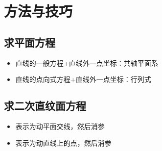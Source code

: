 \documentclass[onecolumn]{ctexart}
\begin{document}
\section{方法与技巧}

\subsection{求平面方程}
\begin{itemize}
  \item 直线的一般方程+直线外一点坐标：共轴平面系
  \item 直线的点向式方程+直线外一点坐标：行列式
\end{itemize}

\subsection{求二次直纹面方程}
\begin{itemize}
  \item 表示为动平面交线，然后消参
  \item 表示为动直线上的点，然后消参
\end{itemize}
\end{document}

